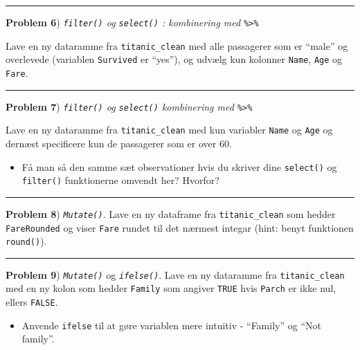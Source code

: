 \documentclass[
]{book}
\providecommand{\tightlist}{%
  \setlength{\itemsep}{0pt}\setlength{\parskip}{0pt}}
\begin{document}
\begin{center}\rule{0.5\linewidth}{0.5pt}\end{center}

\textbf{Problem 6}) \emph{\texttt{filter()} og \texttt{select()} : kombinering med \texttt{\%\textgreater{}\%}}

Lave en ny dataramme fra \texttt{titanic\_clean} med alle passagerer som er ``male'' og overlevede (variablen \texttt{Survived} er ``yes''), og udvælg kun kolonner \texttt{Name}, \texttt{Age} og \texttt{Fare}.

\begin{center}\rule{0.5\linewidth}{0.5pt}\end{center}

\textbf{Problem 7}) \emph{\texttt{filter()} og \texttt{select()} kombinering med \texttt{\%\textgreater{}\%}}

Lave en ny dataramme fra \texttt{titanic\_clean} med kun variabler \texttt{Name} og \texttt{Age} og dernæst specificere kun de passagerer som er over 60.

\begin{itemize}
\tightlist
\item
  Få man så den samme sæt observationer hvis du skriver dine \texttt{select()} og \texttt{filter()} funktionerne omvendt her? Hvorfor?
\end{itemize}

\begin{center}\rule{0.5\linewidth}{0.5pt}\end{center}

\textbf{Problem 8}) \emph{\texttt{Mutate()}}. Lave en ny dataframe fra \texttt{titanic\_clean} som hedder \texttt{FareRounded} og viser \texttt{Fare} rundet til det nærmest integar (hint: benyt funktionen \texttt{round()}).

\begin{center}\rule{0.5\linewidth}{0.5pt}\end{center}

\textbf{Problem 9}) \emph{\texttt{Mutate()}} og \emph{\texttt{ifelse()}}. Lave en ny dataramme fra \texttt{titanic\_clean} med en ny kolon som hedder \texttt{Family} som angiver \texttt{TRUE} hvis \texttt{Parch} er ikke nul, ellers \texttt{FALSE}.

\begin{itemize}
\tightlist
\item
  Anvende \texttt{ifelse} til at gøre variablen mere intuitiv - ``Family'' og ``Not family''.
\end{itemize}
\end{document}
